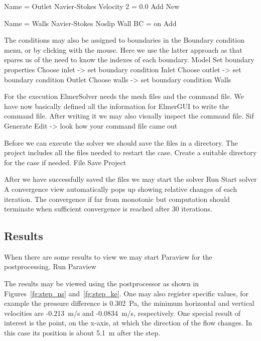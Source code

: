     Name = Outlet
    Navier-Stokes 
      Velocity 2 = 0.0
    Add 
    New
 
    Name = Walls
    Navier-Stokes 
      Noslip Wall BC = on
    Add
\ttend   

The conditions may also be assigned to boundaries in the Boundary condition menu, or 
by clicking with the mouse. Here we use the latter approach as that spares us of the 
need to know the indexes of each boundary.
\ttbegin
Model
  Set boundary properties
    Choose inlet -> set boundary condition Inlet
    Choose outlet -> set boundary condition Outlet
    Choose walls -> set boundary condition Walls
\ttend

For the execution 
ElmerSolver needs the mesh files and the command file. We have now basically defined
all the information for ElmerGUI to write the command file. After writing it we may also visually 
inspect the command file.
\ttbegin
Sif 
  Generate
  Edit -> look how your command file came out  
\ttend

Before we can execute the solver we should save the files in a directory. The project includes
all the files needed to restart the case. Create a suitable directory for the case if needed. 
\ttbegin
File 
  Save Project
\ttend

After we have successfully saved the files we may start the solver
\ttbegin
Run
  Start solver
\ttend
A convergence view automatically pops up showing relative changes of each iteration.
The convergence if far from monotonic but computation should terminate 
when sufficient convergence is reached after 30 iterations.


\subsection*{Results}

When there are some results to view we may start Paraview for the postprocessing.
\ttbegin
Run
  Paraview
\ttend

The results may be viewed using the postprocessor as shown in 
Figures~\ref{fg:step_ns} and~\ref{fg:step_ke}.
One may also register specific values,
for example the pressure difference is 0.302~Pa, the minimum horizontal and vertical velocities
are -0.213~m/s and -0.0834~m/s, respectively.
One special result of interest 
is the point, on the x-axis, at which the direction of the flow changes. 
In this case its position is about 5.1~m after the step. 

